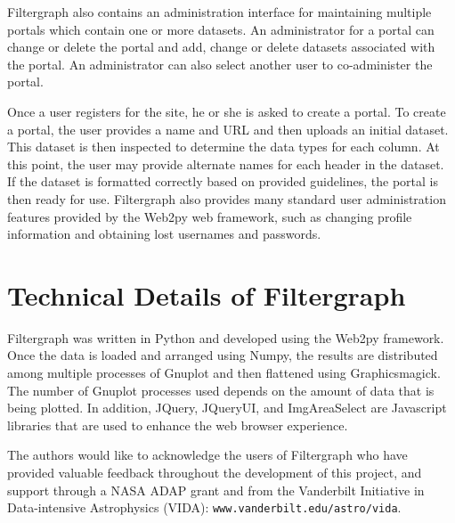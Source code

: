 Filtergraph also contains an administration interface for maintaining multiple portals which contain one or more datasets. An administrator for a portal can change or delete the portal and add, change or delete datasets associated with the portal. An administrator can also select another user to co-administer the portal.

Once a user registers for the site, he or she is asked to create a portal. To create a portal, the user provides a name and URL and then uploads an initial dataset. This dataset is then inspected to determine the data types for each column. At this point, the user may provide alternate names for each header in the dataset. If the dataset is formatted correctly based on provided guidelines, the portal is then ready for use. Filtergraph also provides many standard user administration features provided by the Web2py web framework, such as changing profile information and obtaining lost usernames and passwords.



\section{Technical Details of Filtergraph}
Filtergraph was written in Python and developed using the Web2py framework. Once the data is loaded and arranged using Numpy, the results are distributed among multiple processes of Gnuplot and then flattened using Graphicsmagick. The number of Gnuplot processes used depends on the amount of data that is being plotted. In addition, JQuery, JQueryUI, and ImgAreaSelect are Javascript libraries that are used to enhance the web browser experience. 

\acknowledgements 
The authors would like to acknowledge the users of Filtergraph who have provided valuable feedback throughout the development of this project, and support  through a NASA ADAP grant and from the Vanderbilt Initiative in Data-intensive Astrophysics (VIDA): {\tt www.vanderbilt.edu/astro/vida}. 
